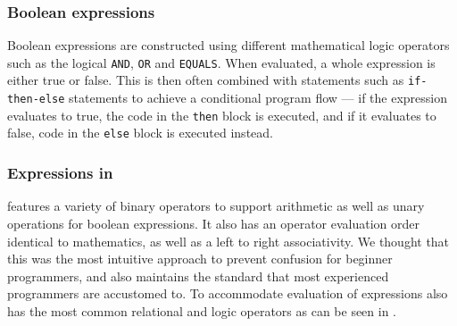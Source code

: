 \subsubsection*{Boolean expressions}
Boolean expressions are constructed using different mathematical logic operators such as the logical \texttt{AND}, \texttt{OR} and \texttt{EQUALS}. 
When evaluated, a whole expression is either true or false. 
This is then often combined with statements such as \texttt{if-then-else} statements to achieve a conditional program flow — if the expression evaluates to true, the code in the \texttt{then} block is executed, and if it evaluates to false, code in the \texttt{else} block is executed instead\cite{sebesta_concepts_2016}.

\subsubsection*{Expressions in \dazel{}}
\dazel{} features a variety of binary operators to support arithmetic as well as unary operations for boolean expressions.
It also has an operator evaluation order identical to mathematics, as well as a left to right associativity.  
We thought that this was the most intuitive approach to prevent confusion for beginner programmers, and also maintains the standard that most experienced programmers are accustomed to.
To accommodate evaluation of expressions \dazel{} also has the most common relational and logic operators as can be seen in . 
